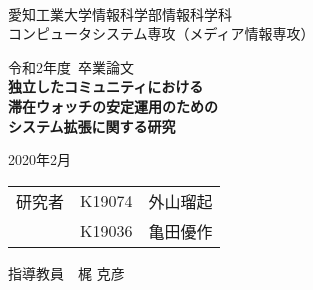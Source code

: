 \begin{titlepage}

  \ \\
  \begin{center}

    {\LARGE 愛知工業大学情報科学部情報科学科\\
      コンピュータシステム専攻（メディア情報専攻）

      \vspace{1.0cm}

      令和2年度~卒業論文\\

      \vspace{2.0cm}
      {\Huge
        \baselineskip=15mm
        \textbf{独立したコミュニティにおける\\滞在ウォッチの安定運用のための\\システム拡張に関する研究\\}}

      \vspace{7.0cm}

      2020年2月\\

      \vspace{1.0cm}

      \begin{tabular}[h]{lll}
        研究者 & K19074 & 外山瑠起 \\
               & K19036 & 亀田優作 \\
      \end{tabular}

      \vspace{1.0cm}

      指導教員\ \ 
       梶 克彦}

  \end{center}

\end{titlepage}
